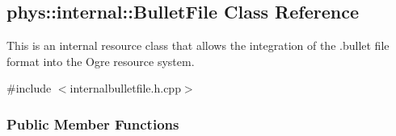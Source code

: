 \hypertarget{classphys_1_1internal_1_1BulletFile}{
\subsection{phys::internal::BulletFile Class Reference}
\label{classphys_1_1internal_1_1BulletFile}
}


This is an internal resource class that allows the integration of the .bullet file format into the Ogre resource system.  




{\ttfamily \#include $<$internalbulletfile.h.cpp$>$}

\subsubsection*{Public Member Functions}
